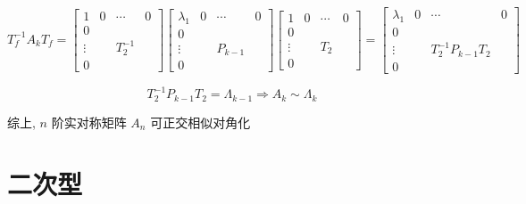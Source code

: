 \begin{theorem}[实对称矩阵的相似对角化]
	$$T_{f}^{-1}A_{k}T_{f} = 
	\begin{bmatrix}
		1           & 0 & \cdots     & 0\\
		0           &   &            & \\
		\vdots      &   & T_{2}^{-1} & \\
		0           &   &            &
	\end{bmatrix}
	\begin{bmatrix}
		\lambda_{1} & 0 & \cdots  & 0\\
		0           &   &         & \\
		\vdots      &   & P_{k-1} & \\
		0           &   &         &  
	\end{bmatrix}
	\begin{bmatrix}
		1           & 0 & \cdots & 0\\
		0           &   &        & \\
		\vdots      &   & T_{2}  & \\
		0           &   &        &
	\end{bmatrix} = 
	\begin{bmatrix}
		\lambda_{1} & 0 & \cdots                 & 0\\
		0           &   &                        & \\
		\vdots      &   & T_{2}^{-1}P_{k-1}T_{2} & \\
		0           &   &                        &  
	\end{bmatrix}$$

	$$T_{2}^{-1}P_{k-1}T_{2} = \varLambda_{k-1} \Rightarrow A_{k}\sim \varLambda_{k}$$

	综上, $n$ 阶实对称矩阵 $A_{n}$ 可正交相似对角化
\end{theorem}



\chapter{二次型}
